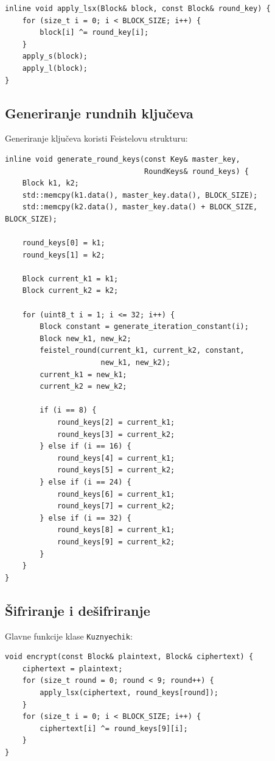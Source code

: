 \documentclass[12pt,a4paper]{article}
\begin{document}
\begin{lstlisting}[style=cpp, caption={LSX-transformacija}, label={lst:lsx}]
inline void apply_lsx(Block& block, const Block& round_key) {
    for (size_t i = 0; i < BLOCK_SIZE; i++) {
        block[i] ^= round_key[i];
    }
    apply_s(block);
    apply_l(block);
}
\end{lstlisting}

\newpage
\subsection{Generiranje rundnih ključeva}

Generiranje ključeva koristi Feistelovu strukturu:

\begin{lstlisting}[style=cpp, caption={Generiranje rundnih ključeva}, label={lst:keygen}]
inline void generate_round_keys(const Key& master_key, 
                                RoundKeys& round_keys) {
    Block k1, k2;
    std::memcpy(k1.data(), master_key.data(), BLOCK_SIZE);
    std::memcpy(k2.data(), master_key.data() + BLOCK_SIZE, BLOCK_SIZE);
    
    round_keys[0] = k1;
    round_keys[1] = k2;
    
    Block current_k1 = k1;
    Block current_k2 = k2;
    
    for (uint8_t i = 1; i <= 32; i++) {
        Block constant = generate_iteration_constant(i);
        Block new_k1, new_k2;
        feistel_round(current_k1, current_k2, constant, 
                      new_k1, new_k2);
        current_k1 = new_k1;
        current_k2 = new_k2;
        
        if (i == 8) {
            round_keys[2] = current_k1;
            round_keys[3] = current_k2;
        } else if (i == 16) {
            round_keys[4] = current_k1;
            round_keys[5] = current_k2;
        } else if (i == 24) {
            round_keys[6] = current_k1;
            round_keys[7] = current_k2;
        } else if (i == 32) {
            round_keys[8] = current_k1;
            round_keys[9] = current_k2;
        }
    }
}
\end{lstlisting}

\newpage
\subsection{Šifriranje i dešifriranje}

Glavne funkcije klase \texttt{Kuznyechik}:

\begin{lstlisting}[style=cpp, caption={Funkcija šifriranja}, label={lst:encrypt}]
void encrypt(const Block& plaintext, Block& ciphertext) {
    ciphertext = plaintext;
    for (size_t round = 0; round < 9; round++) {
        apply_lsx(ciphertext, round_keys[round]);
    }
    for (size_t i = 0; i < BLOCK_SIZE; i++) {
        ciphertext[i] ^= round_keys[9][i];
    }
}
\end{lstlisting}
\end{document}
